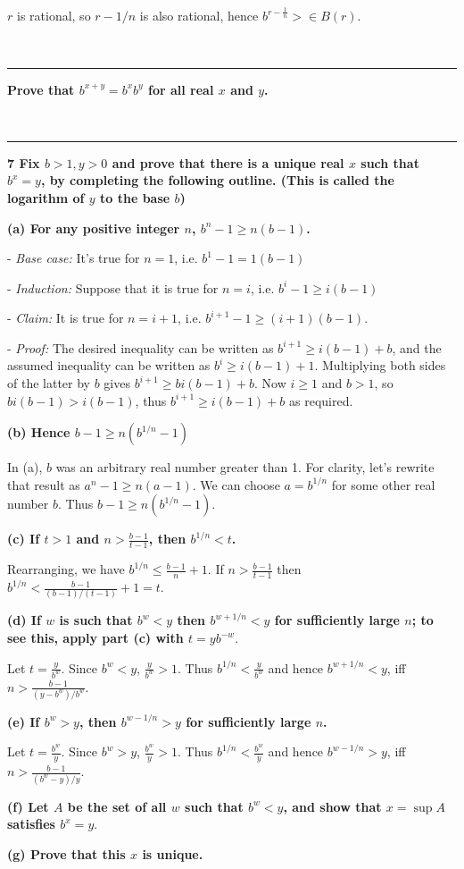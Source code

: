$r$ is rational, so $r - 1/n$ is also rational, hence $b^{r - \frac{1}{n}}> \in B(r)$.

~\\\hrule
\textbf{Prove that $b^{x+y} = b^xb^y$ for all real $x$ and $y$. }

~\\\hrule
\textbf{7 Fix $b > 1, y > 0$ and prove that there is a unique real $x$ such that
$b^x = y$, by completing the following outline. (This is called the logarithm
of $y$ to the base $b$)}

\textbf{(a) For any positive integer $n$, $b^n - 1 \geq n(b-1)$.}

- \textit{Base case:} It's true for $n=1$, i.e. $b^1 - 1 = 1(b-1)$

- \textit{Induction:} Suppose that it is true for $n=i$, i.e. $b^i - 1 \geq i(b-1)$

    - \textit{Claim:} It is true for $n=i+1$, i.e. $b^{i+1} - 1 \geq (i+1)(b-1)$.

    - \textit{Proof:} The desired inequality can be written as $b^{i+1} \geq i(b-1) +
      b$, and the assumed inequality can be written as $b^i \geq i(b-1) +
      1$. Multiplying both sides of the latter by $b$ gives $b^{i+1} \geq
      bi(b-1) + b$. Now $i \geq 1$ and $b>1$, so $bi(b-1) > i(b-1)$, thus
      $b^{i+1} \geq i(b-1) + b$ as required.


\textbf{(b) Hence $b - 1 \geq n(b^{1/n} - 1)$}

In (a), $b$ was an arbitrary real number greater than 1. For clarity, let's
rewrite that result as $a^n - 1 \geq n(a-1)$. We can choose $a=b^{1/n}$ for
some other real number $b$. Thus $b - 1 \geq n(b^{1/n}-1)$.

\textbf{(c) If $t > 1$ and $n > \frac{b-1}{t-1}$, then $b^{1/n} < t$.}

Rearranging, we have $b^{1/n} \leq \frac{b-1}{n} + 1$. If $n > \frac{b-1}{t-1}$
then $b^{1/n} < \frac{b-1}{(b-1)/(t-1)} + 1 = t$.

\textbf{(d) If $w$ is such that $b^w < y$ then $b^{w + 1/n} < y$ for sufficiently
large $n$; to see this, apply part (c) with $t = yb^{-w}.$}

Let $t = \frac{y}{b^w}$. Since $b^w < y$, $\frac{y}{b^w} > 1$. Thus $b^{1/n} <
\frac{y}{b^w}$ and hence $b^{w + 1/n} < y$, iff $n > \frac{b-1}{(y -
b^w)/b^w}$.

\textbf{(e) If $b^w > y$, then $b^{w - 1/n} > y$ for sufficiently large $n$.}

Let $t = \frac{b^w}{y}$. Since $b^w > y$, $\frac{b^w}{y} > 1$. Thus $b^{1/n} <
\frac{b^w}{y}$ and hence $b^{w - 1/n} > y$, iff $n > \frac{b-1}{(b^w -
y)/y}$.


\textbf{(f) Let $A$ be the set of all $w$ such that $b^w < y$, and show that $x =
\sup A$ satisfies $b^x = y.$}

\textbf{(g) Prove that this $x$ is unique.}
